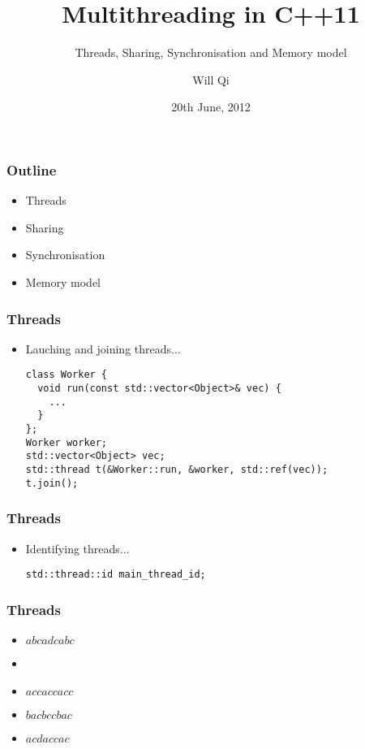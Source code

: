\documentclass{beamer}
\title{Multithreading in C++11}
\subtitle{Threads, Sharing, Synchronisation and Memory model}
\author{Will Qi}
\date{20th June, 2012}
\begin{document}
\maketitle

\begin{frame}
  \frametitle{Outline}
  \begin{itemize}
  \item Threads
    \pause
  \item Sharing
    \pause
  \item Synchronisation
    \pause
  \item Memory model
  \end{itemize}
\end{frame}

\begin{frame}[fragile]
  \frametitle{Threads}
  \begin{itemize}
  \item Lauching and joining threads...
    \pause
\begin{verbatim}
class Worker {
  void run(const std::vector<Object>& vec) {
    ...
  }
};
Worker worker;
std::vector<Object> vec;
std::thread t(&Worker::run, &worker, std::ref(vec));
t.join();
\end{verbatim}
  \end{itemize}
\end{frame}

\begin{frame}[fragile]
  \frametitle{Threads}
  \begin{itemize}
  \item Identifying threads...
    \pause
\begin{verbatim}
std::thread::id main_thread_id;

\end{verbatim}
  \end{itemize}
\end{frame}

\begin{frame}
  \frametitle{Threads}
  \begin{itemize}[<+->]
  \item<1> $abcadcabc$
  \item<1-2> 
  \item<1-2> $accaccacc$
  \item<1> $bacbccbac$
  \item<1,3> $acdaccac$
  \end{itemize}
\end{frame}
\end{document}
